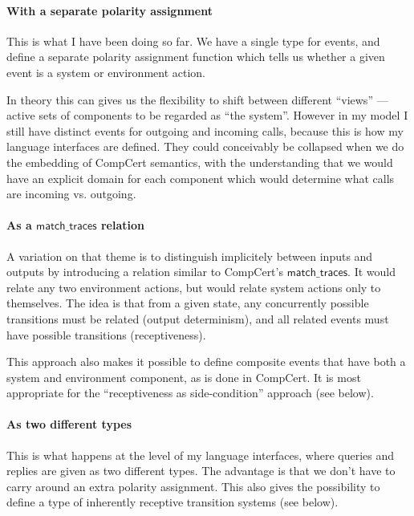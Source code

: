 \documentclass[11pt]{article}
\begin{document}
\paragraph{With a separate polarity assignment}

This is what I have been doing so far.
We have a single type for events,
and define a separate polarity assignment function
which tells us whether a given event
is a system or environment action.

In theory this can gives us the flexibility to shift between
different ``views'' --- active sets of components to be regarded as ``the system''.
However in my model I still have distinct events
for outgoing and incoming calls,
because this is how my language interfaces are defined.
They could conceivably be collapsed
when we do the embedding of CompCert semantics,
with the understanding that we would have an explicit domain
for each component
which would determine what calls are incoming vs. outgoing.

\paragraph{As a $\mathsf{match\_traces}$ relation}

A variation on that theme is to
distinguish implicitely between inputs and outputs
by introducing a relation similar to CompCert's
$\mathsf{match\_traces}$.
It would relate any two environment actions,
but would relate system actions only to themselves.
The idea is that from a given state,
any concurrently possible transitions must be related
(output determinism),
and all related events must have possible transitions
(receptiveness).

This approach also makes it possible to define
composite events that have both a system and environment component,
as is done in CompCert.
It is most appropriate for the
``receptiveness as side-condition''
approach (see below).

\paragraph{As two different types}

This is what happens at the level of my language interfaces,
where queries and replies are given
as two different types.
The advantage is that we don't have to carry around
an extra polarity assignment.
This also gives the possibility to define
a type of
inherently receptive transition systems (see below).
\end{document}
